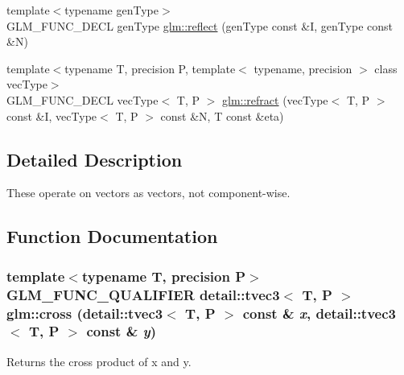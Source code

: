 \begin{CompactItemize}
\item 
{\footnotesize template$<$typename genType$>$ }\\GLM\_\-FUNC\_\-DECL genType \hyperlink{group__core__func__geometric_gc973ce2bc49f749a469d3ed2e2ac5a54}{glm::reflect} (genType const \&I, genType const \&N)
\item 
{\footnotesize template$<$typename T, precision P, template$<$ typename, precision $>$ class vecType$>$ }\\GLM\_\-FUNC\_\-DECL vecType$<$ T, P $>$ \hyperlink{group__core__func__geometric_g2020e01c134ebe03c1690306ff93af53}{glm::refract} (vecType$<$ T, P $>$ const \&I, vecType$<$ T, P $>$ const \&N, T const \&eta)
\end{CompactItemize}


\subsection{Detailed Description}
These operate on vectors as vectors, not component-wise. 

\subsection{Function Documentation}
\hypertarget{group__core__func__geometric_g9a325364ff3650c4a85c33704c646e76}{
\subsubsection[cross]{\setlength{\rightskip}{0pt plus 5cm}template$<$typename T, precision P$>$ GLM\_\-FUNC\_\-QUALIFIER detail::tvec3$<$ T, P $>$ glm::cross (detail::tvec3$<$ T, P $>$ const \& {\em x}, \/  detail::tvec3$<$ T, P $>$ const \& {\em y})}}
\label{group__core__func__geometric_g9a325364ff3650c4a85c33704c646e76}


Returns the cross product of x and y.

